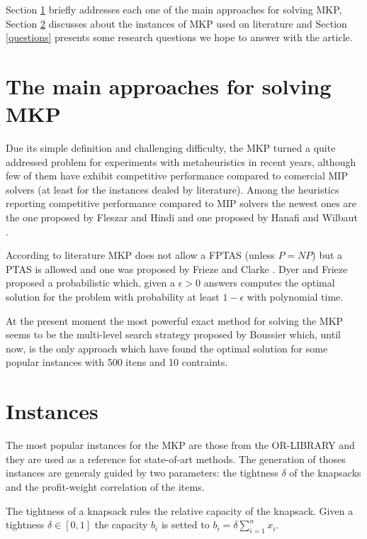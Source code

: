 \documentclass{article}
\begin{document}
Section \ref{algs} briefly addresses each one of the main approaches for
solving MKP, Section \ref{insts} discusses about the instances of MKP used on
literature and Section \ref{questions} presents some research questions 
we hope to answer with the article.

\section{The main approaches for solving MKP}
\label{algs}
Due its simple definition and challenging difficulty, the MKP
turned a quite addressed problem for experiments with metaheuristics in recent
years, although few of them have exhibit competitive performance compared to
comercial MIP solvers (at least for the instances dealed by literature).
Among the heuristics reporting competitive performance compared to MIP solvers
the newest ones are the one proposed by Fleszar and Hindi \cite{fleszar2009fast}
and one proposed by Hanafi and Wilbaut \cite{hanafi2011improved}.

According to literature MKP does not allow a FPTAS (unless $P=NP$) but a PTAS is
allowed and one was proposed by Frieze and Clarke \cite{frieze1984approximation}.
Dyer and Frieze \cite{dyer1989probabilistic} proposed a probabilistic which,
given a $\epsilon > 0$ answers computes the optimal solution for the problem
with probability at least $1 - \epsilon$ with polynomial time.

At the present moment the most powerful exact method for solving the MKP seems
to be the multi-level search strategy proposed by Boussier \cite{boussier2010multi}
which, until now, is the only approach which have found the optimal solution for
some popular instances with 500 itens and 10 contraints.

\section{Instances}
\label{insts}

The most popular instances for the MKP are those from the OR-LIBRARY
and they are used as a reference for state-of-art methods.
The generation of thoses instances are generaly guided by two parameters: the
tightness $\delta$ of the knapsacks and the profit-weight correlation of the
items.

The tightness of a knapsack rules the relative capacity of the knapsack.
Given a tightness $\delta \in [0,1]$ the capacity $b_i$ is setted to
$b_i = \delta \sum_{i=1}^n x_i$.  %
\end{document}
